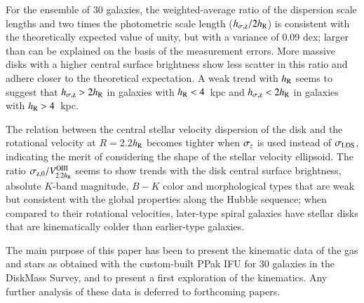 \documentclass[traditabstract]{aa} %
\begin{document}
For the ensemble of 30 galaxies, the weighted-average ratio of the dispersion
scale lengths and two times the photometric scale length ($h_{\sigma{\rm,z}}/2h_{\rm R}$)
is consistent with the theoretically expected value of unity, but with a
variance of 0.09 dex; larger than can be explained on the basis of the
measurement errors.  More massive disks with a higher central surface brightness
show less scatter in this ratio and adhere closer to the theoretical
expectation. A weak trend with $h_{\rm R}$ seems to suggest that $h_{\sigma{\rm,z}}>2h_{\rm R}$
in galaxies with $h_{\rm R}<4$~kpc and $h_{\sigma{\rm,z}}<2h_{\rm R}$ in galaxies with
$h_{\rm R}>4$~kpc.

The relation between the central stellar velocity dispersion of the disk and the
rotational velocity at $R$$=$2.2$h_{\rm R}$ becomes tighter when $\sigma_z$ is used 
instead of $\sigma_{\rm LOS}$, indicating the merit of considering the shape of the stellar velocity
ellipsoid.  The ratio $\sigma_{\rm z,0}/V_{2.2h_{\rm R}}^{\rm OIII}$ seems to show trends
with the disk central surface brightness, absolute $K$-band magnitude, $B-K$
color and morphological types that are weak but consistent with the global
properties along the Hubble sequence; when compared to their rotational
velocities, later-type spiral galaxies have stellar disks that are kinematically
colder than earlier-type galaxies.

The main purpose of this paper has been to present the kinematic data of the gas
and stars as obtained with the custom-built PPak IFU for 30 galaxies in the
DiskMass Survey, and to present a first exploration of the kinematics. Any
further analysis of these data is deferred to forthcoming papers.


\end{document}
